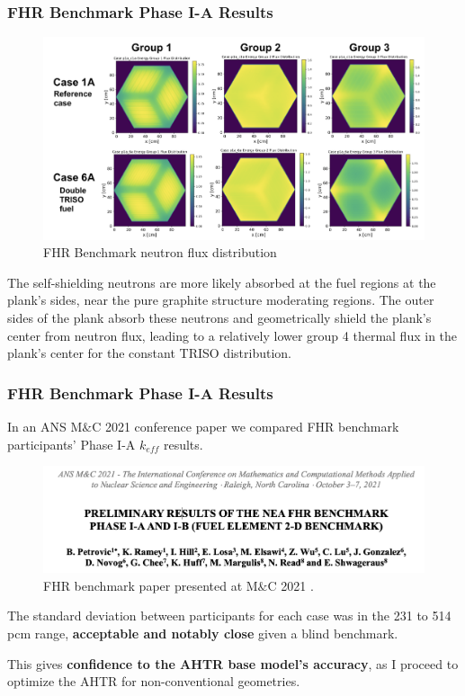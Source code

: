 \begin{frame}
    \frametitle{FHR Benchmark Phase I-A Results}
    \begin{figure}
        \centering
        \includegraphics[width=\linewidth]{figures/phase1a-flux.png} 
        \vspace{-0.5cm}
        \caption{FHR Benchmark neutron flux distribution}
    \end{figure}
    \vspace{-0.3cm}
    The self-shielding neutrons are more likely absorbed at the fuel regions at the 
    plank's sides, near the pure graphite structure moderating regions. 
    The outer sides of the plank absorb these neutrons and geometrically shield the 
    plank's center from neutron flux, leading to a relatively lower group 4 thermal 
    flux in the plank's center for the constant TRISO distribution. 
\end{frame}

\begin{frame}
    \frametitle{FHR Benchmark Phase I-A Results}
    In an ANS M$\&$C 2021 conference paper we compared FHR benchmark participants' 
    Phase I-A $k_{eff}$ results. 
    \begin{figure}[]
        \centering
        \includegraphics[width=0.85\linewidth]{figures/mnc.png} 
        \caption{FHR benchmark paper presented at M$\&$C 2021 
        \cite{petrovic_preliminary_2021}.}
    \end{figure}

    The standard deviation between participants for each case was in the 231 to 514 
    pcm range, \textbf{acceptable and notably close} given a blind benchmark.

    \vspace{0.2cm}
    This gives \textbf{confidence to the AHTR base model's accuracy}, as I 
    proceed to optimize the AHTR for non-conventional geometries. 
\end{frame}
